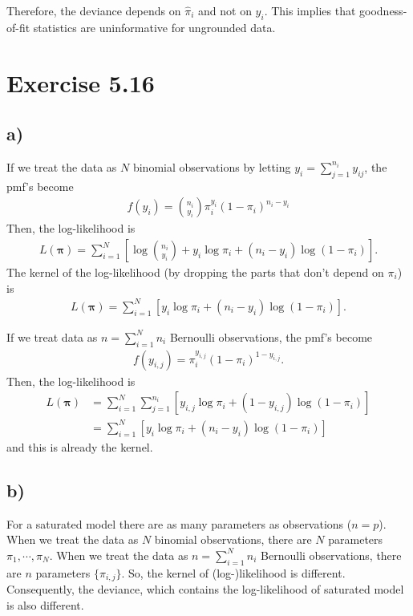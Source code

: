 \documentclass[a4paper]{article}
\begin{document}
Therefore, the deviance depends on $\widehat{\pi}_{i}$ and not on $y_{i}$. This implies that goodness-of-fit statistics are uninformative for ungrounded data.



\vspace{\baselineskip}
\section{Exercise 5.16}
\subsection{a)}
If we treat the data as $N$ binomial observations by letting $y_{i} = \sum_{j=1}^{n_{i}}y_{ij}$, the pmf's become
\begin{align*}
f(y_{i}) = \binom{n_{i}}{y_i} \pi_{i}^{y_{i}} (1-\pi_{i})^{n_{i}-y_{i}}
\end{align*}
Then, the log-likelihood is
\begin{align*}
L(\bm{\pi}) = \sum_{i=1}^{N} \left[\log\binom{n_{i}}{y_i} + y_{i}\log\pi_{i} + (n_{i}-y_{i})\log(1-\pi_{i})\right].
\end{align*}
The kernel of the log-likelihood (by dropping the parts that don't depend on $\pi_{i}$) is
\begin{align*}
L(\bm{\pi}) = \sum_{i=1}^{N} \left[y_{i}\log\pi_{i} + (n_{i}-y_{i})\log(1-\pi_{i})\right].
\end{align*}

If we treat data as $n = \sum_{i=1}^{N} n_{i}$ Bernoulli observations, the pmf's become
\begin{align*}
f(y_{i,j}) = \pi_{i}^{y_{i,j}} (1-\pi_{i})^{1-y_{i,j}}.
\end{align*}
Then, the log-likelihood is
\begin{align*}
L(\bm{\pi}) &= \sum_{i=1}^{N} \sum_{j=1}^{n_{i}}\left[y_{i,j}\log\pi_{i} + (1-y_{i,j})\log(1-\pi_{i})\right]\\
&= \sum_{i=1}^{N} \left[y_{i}\log\pi_{i} + (n_{i}-y_{i})\log(1-\pi_{i})\right]
\end{align*}
and this is already the kernel.

\vspace{\baselineskip}
\subsection{b)}
For a saturated model there are as many parameters as observations ($n = p$). When we treat the data as $N$ binomial observations, there are $N$ parameters $\pi_{1}, \cdots, \pi_{N}$. When we treat the data as $n = \sum_{i=1}^{N} n_{i}$ Bernoulli observations, there are $n$ parameters $\{\pi_{i,j}\}$.
So, the kernel of (log-)likelihood is different. Consequently, the deviance, which contains the log-likelihood of saturated model is also different.
\end{document}
